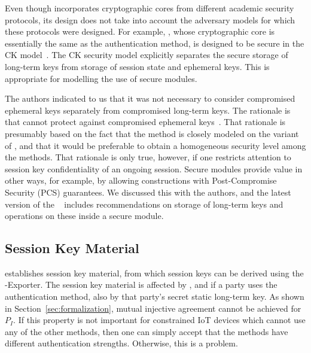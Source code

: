 \documentclass[runningheads]{llncs}
\begin{document}
Even though \mEdhoc{} incorporates cryptographic cores from different academic
security protocols, its design does not take into account the adversary models
for which these protocols were designed.
%
For example, \mOptls{}, whose cryptographic core is essentially the same
as the \mStat{} authentication method, is designed to be secure in the CK
model~\cite{DBLP:conf/crypto/CanettiK02}.
%
The CK security model explicitly separates the secure storage of long-term
keys from storage of session state and ephemeral keys.
%
This is appropriate for modelling the use of secure modules.
%

The \mEdhoc{} authors indicated to us that it was
not necessary to consider compromised ephemeral keys separately from
compromised long-term keys.
%
The rationale is that \mSigma{} cannot protect against compromised ephemeral
keys~\cite{personalCommunication}.
%
That rationale is presumably based on the fact that the \mSigSig{} method is
closely modeled on the \mSigmaI{} variant of \mSigma{}, and that it would be
preferable to obtain a homogeneous security level among the \mEdhoc{}
methods.
%
That rationale is only true, however, if one restricts attention to session key
confidentiality of an ongoing session.
%
Secure modules provide value in other ways, for example, by allowing
constructions with Post-Compromise Security (PCS) guarantees.
%
We discussed this with the authors, and
the latest version of the \mSpec{}~\cite{latest-ietf-lake-edhoc-05} includes
recommendations on storage of long-term keys and operations on these inside a
secure module.
%

\subsection{Session Key Material}
\label{sec:sessionKeyMaterial}
\mEdhoc{} establishes session key material, from which session keys
can be derived using the \mEdhoc{}-Exporter.
%
The session key material is affected by \mGxy{}, and if a party uses the
\mStat{} authentication method, also by that party's secret static long-term key.
%
As shown in Section~\ref{sec:formalization}, mutual injective agreement cannot
be achieved for $P_I$.
%
If this property is not important for constrained IoT devices which cannot use
any of the other methods, then one can simply accept that the methods have
different authentication strengths.
%
Otherwise, this is a problem.
%
\end{document}
